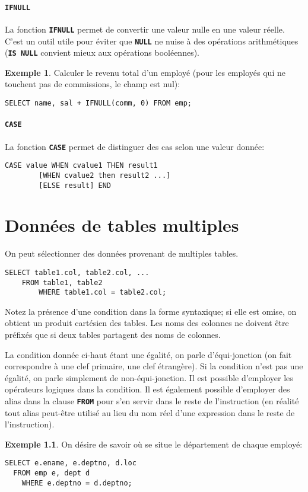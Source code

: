 \documentclass[a4paper, 12pt]{report}
\newcommand{\textSQL}[1]{\texttt{\textbf{#1}}}
\theoremstyle{definition} \newtheorem{ex}{Exemple}
\begin{document}
\subsubsection{\textSQL{IFNULL}}
La fonction \textSQL{IFNULL} permet de convertir une valeur nulle en une valeur réelle. C'est un outil utile pour éviter que \textSQL{NULL} ne nuise à des opérations arithmétiques (\textSQL{IS NULL} convient mieux aux opérations booléennes).
\begin{ex}
Calculer le revenu total d'un employé (pour les employés qui ne touchent pas de commissions, le champ est nul):
	\begin{lstlisting}[frame=single]
 SELECT name, sal + IFNULL(comm, 0) FROM emp;
\end{lstlisting}
\end{ex}

\subsubsection{\textSQL{CASE}}
La fonction \textSQL{CASE} permet de distinguer des cas selon une valeur donnée:
	\begin{lstlisting}[frame=single]
 CASE value WHEN cvalue1 THEN result1
		[WHEN cvalue2 then result2 ...]
		[ELSE result] END
\end{lstlisting}

\chapter{Données de tables multiples}
On peut sélectionner des données provenant de multiples tables.
	\begin{lstlisting}[frame=single]
 SELECT table1.col, table2.col, ...
    FROM table1, table2
		WHERE table1.col = table2.col;
\end{lstlisting}
Notez la présence d'une condition dans la forme syntaxique; si elle est omise, on obtient un produit cartésien des tables. Les noms des colonnes ne doivent être préfixés que si deux tables partagent des noms de colonnes.

La condition donnée ci-haut étant une égalité, on parle d'équi-jonction (on fait correspondre à une clef primaire, une clef étrangère). Si la condition n'est pas une égalité, on parle simplement de non-équi-jonction. Il est possible d'employer les opérateurs logiques dans la condition. Il est également possible d'employer des alias dans la clause \textSQL{FROM} pour s'en servir dans le reste de l'instruction (en réalité tout alias peut-être utilisé au lieu du nom réel d'une expression dans le reste de l'instruction).
\begin{ex}
On désire de savoir où se situe le département de chaque employé:
\begin{lstlisting}[frame=single]
SELECT e.ename, e.deptno, d.loc
  FROM emp e, dept d
	WHERE e.deptno = d.deptno;
\end{lstlisting}
\end{ex}
\end{document}
